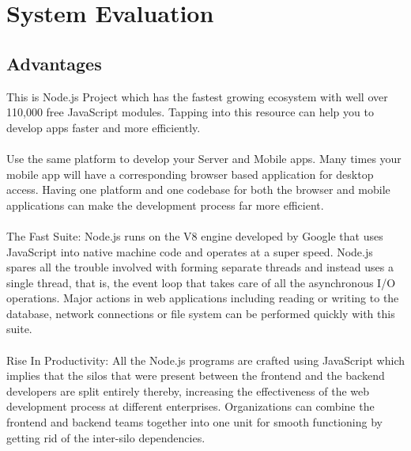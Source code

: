 \chapter{System Evaluation}
\section{Advantages}
This is Node.js Project which has the fastest growing ecosystem with well over 110,000 free JavaScript modules. Tapping into this resource can help you to develop apps faster and more efficiently\cite{11}. \\ \\ 
Use the same platform to develop your Server and Mobile apps. Many times your mobile app will have a corresponding browser based application for desktop access. Having one platform and one codebase for both the browser and mobile applications can make the development process far more efficient. \\ \\ 
The Fast Suite: Node.js runs on the V8 engine developed by Google that uses JavaScript into native machine code and operates at a super speed. Node.js spares all the trouble involved with forming separate threads and instead uses a single thread, that is, the event loop that takes care of all the asynchronous I/O operations. Major actions in web applications including reading or writing to the database, network connections or file system can be performed quickly with this suite. \\ \\  Rise In Productivity: All the Node.js programs are crafted using JavaScript which implies that the silos that were present between the frontend and the backend developers are split entirely thereby, increasing the effectiveness of the web development process at different enterprises. Organizations can combine the frontend and backend teams together into one unit for smooth functioning by getting rid of the inter-silo dependencies. \\ \\ 
